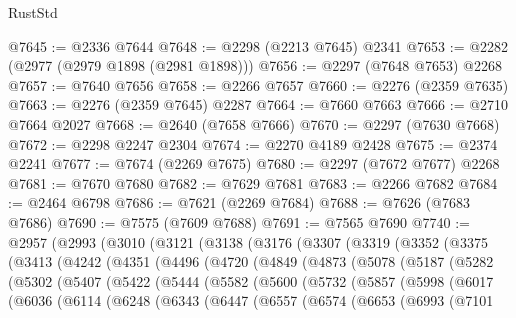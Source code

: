 \begin{lexlean}{RustStd}
\begin{coremodule}
{\begin{coremodule}
{{{{{{{{{{{{{{{{{{{{{{{{{{{{{{{{{{{{{{{{{{{{{{{{{{{{{{@7645 := @2336 @7644
@7648 := @2298 (@2213 @7645) @2341
@7653 := @2282 (@2977 (@2979 @1898 (@2981 @1898)))
@7656 := @2297 (@7648 @7653) @2268
@7657 := @7640 @7656
@7658 := @2266 @7657
@7660 := @2276 (@2359 @7635)
@7663 := @2276 (@2359 @7645) @2287
@7664 := @7660 @7663
@7666 := @2710 @7664 @2027
@7668 := @2640 (@7658 @7666)
@7670 := @2297 (@7630 @7668)
@7672 := @2298 @2247 @2304
@7674 := @2270 @4189 @2428
@7675 := @2374 @2241
@7677 := @7674 (@2269 @7675)
@7680 := @2297 (@7672 @7677) @2268
@7681 := @7670 @7680
@7682 := @7629 @7681
@7683 := @2266 @7682
@7684 := @2464 @6798
@7686 := @7621 (@2269 @7684)
@7688 := @7626 (@7683 @7686)
@7690 := @7575 (@7609 @7688)
@7691 := @7565 @7690
@7740 := @2957
    (@2993
      (@3010
        (@3121
          (@3138
            (@3176
              (@3307
                (@3319
                  (@3352
                    (@3375
                      (@3413
                        (@4242
                          (@4351
                            (@4496
                              (@4720
                                (@4849
                                  (@4873
                                    (@5078
                                      (@5187
                                        (@5282
                                          (@5302
                                            (@5407
                                              (@5422
                                                (@5444
                                                  (@5582
                                                    (@5600
                                                      (@5732
                                                        (@5857
                                                          (@5998
                                                            (@6017
                                                              (@6036
                                                                (@6114
                                                                  (@6248
                                                                    (@6343
                                                                      (@6447
                                                                        (@6557
                                                                          (@6574
                                                                            (@6653
                                                                              (@6993
                                                                                (@7101
}}}}}}}}}}}}}}}}}}}}}}}}}}}}}}}}}}}}}}}}}}}}}}}}}}}}}}
\end{coremodule}}
\end{coremodule}
\end{lexlean}
